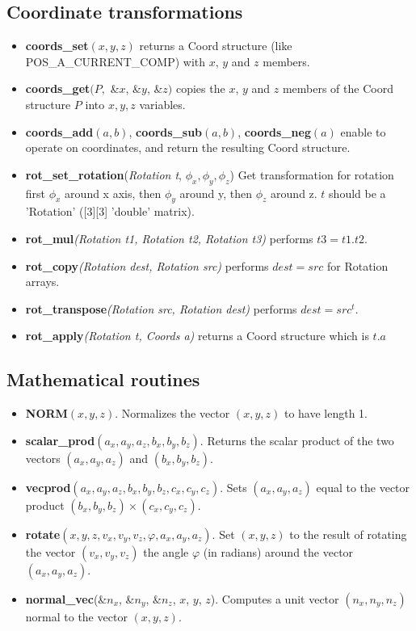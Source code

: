 \subsection{Coordinate transformations}
\begin{itemize}
\item {\bf coords\_set}$(x,y,z)$ returns a Coord structure (like POS\_A\_CURRENT\_COMP) with $x$, $y$ and $z$ members.
\item {\bf  coords\_get}$(P,$ \&$x$, \&$y$, \&$z)$ copies the $x$, $y$ and 
$z$ members of the Coord structure $P$ into $x,y,z$ variables.
\item {\bf coords\_add}$(a,b)$, {\bf coords\_sub}$(a,b)$, {\bf
coords\_neg}$(a)$ enable to  operate on coordinates, and return the
resulting Coord structure.
\item {\bf rot\_set\_rotation}({\it Rotation t}, $\phi_x, \phi_y, \phi_z$) Get transformation for rotation first $\phi_x$ around x axis, then $\phi_y$ around y, then $\phi_z$ around z. $t$ should be a 'Rotation' ([3][3] 'double' matrix).
\item {\bf rot\_mul}{\it (Rotation t1, Rotation t2, Rotation t3)} performs $t3 = t1 . t2$.
\item {\bf rot\_copy}{\it (Rotation dest, Rotation src)} performs $dest = src$ for Rotation arrays.
\item {\bf rot\_transpose}{\it (Rotation src, Rotation dest)} performs $dest = src^t$.
\item {\bf rot\_apply}{\it (Rotation t, Coords a)} returns a Coord structure which is $t.a$
\end{itemize}

\subsection{Mathematical routines}
\begin{itemize}
\item {\bf NORM}$(x,y,z)$. Normalizes the vector $(x,y,z)$ to have
  length 1.
\item {\bf scalar\_prod}$(a_x,a_y,a_z,b_x,b_y,b_z)$. Returns the scalar
  product of the two vectors $(a_x,a_y,a_z)$ and $(b_x,b_y,b_z)$.
\item {\bf vecprod}$(a_x,a_y,a_z,b_x,b_y,b_z, c_x,c_y,c_z)$. Sets
  $(a_x,a_y,a_z)$ equal to the vector product $(b_x,b_y,b_z) \times (c_x,c_y,c_z)$.
\item {\bf rotate}$(x,y,z,v_x,v_y,v_z,\varphi,a_x,a_y,a_z)$. Set
  $(x,y,z)$ to the result of rotating the vector $(v_x,v_y,v_z)$
  the angle $\varphi$ (in radians) around the vector $(a_x,a_y,a_z)$.
\item {\bf normal\_vec}(\&$n_x$, \&$n_y$, \&$n_z$, $x$, $y$, $z$).
  Computes a unit vector $(n_x, n_y, n_z)$ normal to the vector
  $(x,y,z)$.
\end{itemize}

